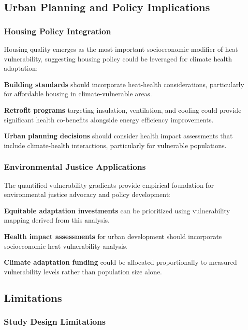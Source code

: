 \documentclass[11pt,a4paper]{article}
\begin{document}
\subsection{Urban Planning and Policy Implications}

\subsubsection{Housing Policy Integration}

Housing quality emerges as the most important socioeconomic modifier of heat vulnerability, suggesting housing policy could be leveraged for climate health adaptation:

\textbf{Building standards} should incorporate heat-health considerations, particularly for affordable housing in climate-vulnerable areas.

\textbf{Retrofit programs} targeting insulation, ventilation, and cooling could provide significant health co-benefits alongside energy efficiency improvements.

\textbf{Urban planning decisions} should consider health impact assessments that include climate-health interactions, particularly for vulnerable populations.

\subsubsection{Environmental Justice Applications}

The quantified vulnerability gradients provide empirical foundation for environmental justice advocacy and policy development:

\textbf{Equitable adaptation investments} can be prioritized using vulnerability mapping derived from this analysis.

\textbf{Health impact assessments} for urban development should incorporate socioeconomic heat vulnerability analysis.

\textbf{Climate adaptation funding} could be allocated proportionally to measured vulnerability levels rather than population size alone.

\subsection{Limitations}

\subsubsection{Study Design Limitations}
\end{document}
